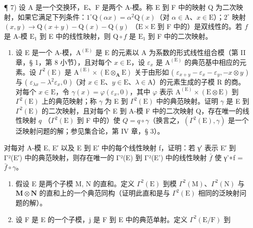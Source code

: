 ¶ 7) 设 A 是一个交换环，E、F 是两个 A-模。称 E 到 F 中的映射 Q 为二次映射，如果它满足下列条件：\(1^{\circ} \mathrm{Q}(\alpha x) = \alpha^{2} \mathrm{Q}(x)\)（对 \(\alpha \in \mathrm{A}\)、\(x \in \mathrm{E}\)）；\(2^{\circ}\) 映射 \((x, y) \to \mathrm{Q}(x + y) - \mathrm{Q}(x) - \mathrm{Q}(y)\) （\(\mathrm{E} \times \mathrm{E}\) 到 F 中的）是双线性的。若 \(f\) 是 A-模 \(\mathrm{E}_{1}\) 到 E 中的线性映射，则 \(\mathrm{Q} \circ f\) 是 \(\mathrm{E}_{1}\) 到 F 中的二次映射。

\begin{enumerate}
\def\labelenumi{\alph{enumi})}
\tightlist
\item
  设 E 是一个 A-模，\(\mathrm{A}^{(\mathrm{E})}\) 是 E 的元素以 A 为系数的形式线性组合模（第 II 章，§ 1，第 8 小节），且对每个 \(x \in \mathrm{E}\)，设 \(\varepsilon_x\) 是 \(\mathrm{A}^{(\mathrm{E})}\) 的典范基中相应的元素。设 \(\Gamma^2(\mathrm{E})\) 是 \(\mathrm{A}^{(\mathrm{E})} \times (\mathrm{E} \otimes_{\mathbf{A}} \mathrm{E})\) 关于由形如 ( \(\varepsilon_{x+y} - \varepsilon_x - \varepsilon_y, -x \otimes y\) ) 与 ( \(\varepsilon_{\lambda x} - \lambda^2\varepsilon_x, 0\) )（对 \(x \in \mathrm{E}\)、\(y \in \mathrm{E}\)、\(\lambda \in \mathrm{A}\)）的元素生成的子模 R 的商。对每个 \(x \in \mathrm{E}\)，令 \(\gamma(x) = \varphi(\varepsilon_x, 0)\)，其中 \(\varphi\) 表示 \(\mathrm{A}^{(\mathrm{E})} \times (\mathrm{E} \otimes \mathrm{E})\) 到 \(\Gamma^2(\mathrm{E})\) 上的典范映射；称 \(\gamma\) 为 E 到 \(\Gamma^2(\mathrm{E})\) 中的典范映射。证明 \(\gamma\) 是 E 到 \(\Gamma^2(\mathrm{E})\) 的二次映射，且对每个 E 到 A-模 F 中的二次映射 Q，存在唯一的线性映射 \(q\) （\(\Gamma^2(\mathrm{E})\) 到 F 中的）使 \(Q = q \circ \gamma\)（换言之，\((\Gamma^2(\mathrm{E}), \gamma)\) 是一个泛映射问题的解；参见集合论，第 IV 章，§ 3）。
\end{enumerate}

对每对 A-模 E, E′ 以及 E 到 E′ 中的每个线性映射 f，证明：若 γ′ 表示 E′ 到 Γ²(E′) 中的典范映射，则存在唯一的 Γ²(E) 到 Γ²(E') 中的线性映射 \(\bar{f}\) 使 γ'∘f = \(\bar{f} \circ \gamma\)。

\begin{enumerate}
\def\labelenumi{\alph{enumi})}
\setcounter{enumi}{1}
\item
  假设 E 是两个子模 M, N 的直和。定义 \(\Gamma^{2}(\mathrm{E})\) 到模 \(\Gamma^{2}(\mathrm{M})\)、\(\Gamma^{2}(\mathrm{N})\) 与 \(\mathbf{M} \otimes \mathbf{N}\) 的直和上的一个典范同构（证明此直和是与 \(\Gamma^{2}(\mathrm{E})\) 相同的泛映射问题的解）。
\item
  设 F 是 E 的一个子模，j 是 F 到 E 中的典范单射。定义 \(\Gamma^{2}(\mathrm{E}/\mathrm{F})\) 到
\end{enumerate}

